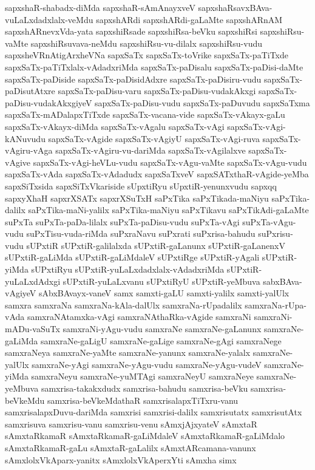 {sapxshaR-shabadx-diMda
sapxshaR-sAmAnayxveV
sapxshaRsavxBAva-vuLaLxdadxlalx-veMdu
sapxshARdi
sapxshARdi-gaLaMte
sapxshARnAM
sapxshARnevxVda-yata
sapxshiRsade
sapxshiRsa-beVku
sapxshiRsi
sapxshiRsu-vaMte
sapxshiRsuvava-neMdu
sapxshiRsu-vu-dilalx
sapxshiRsu-vudu
sapxsheVRnAtigArxheVNa
sapxSaTx
sapxSaTx-toVrike
sapxSaTx-paTiTxde
sapxSaTx-paTiTxlalx-vAdadxriMda
sapxSaTx-paDisalu
sapxSaTx-paDisi-daMte
sapxSaTx-paDiside
sapxSaTx-paDisidAdxre
sapxSaTx-paDisiru-vudu
sapxSaTx-paDisutAtxre
sapxSaTx-paDisu-varu
sapxSaTx-paDisu-vudakAkxgi
sapxSaTx-paDisu-vudakAkxgiyeV
sapxSaTx-paDisu-vudu
sapxSaTx-paDuvudu
sapxSaTxma
sapxSaTx-mADalapxTiTxde
sapxSaTx-vacana-vide
sapxSaTx-vAkayx-gaLu
sapxSaTx-vAkayx-diMda
sapxSaTx-vAgalu
sapxSaTx-vAgi
sapxSaTx-vAgi-kANuvudu
sapxSaTx-vAgide
sapxSaTx-vAgiyU
sapxSaTx-vAgi-ruva
sapxSaTx-vAgiru-vAga
sapxSaTx-vAgiru-vu-dariMda
sapxSaTx-vAgilalxve
sapxSaTx-vAgive
sapxSaTx-vAgi-heVLu-vudu
sapxSaTx-vAgu-vaMte
sapxSaTx-vAgu-vudu
sapxSaTx-vAda
sapxSaTx-vAdadudx
sapxSaTxveV
sapxSATxthaR-vAgide-yeMba
sapxSiTxsida
sapxSiTxVkariside
sUpxtiRyu
sUpxtiR-yenunxvudu
sapxqq
sapxyXhaH
sapxrXSATx
sapxrXSuTxH
saPxTika
saPxTikada-maNiyu
saPxTika-dalilx
saPxTika-maNi-yalilx
saPxTika-maNiyu
saPxTikavu
saPxTikAdi-gaLaMte
suPxTa
suPxTa-paDa-lilalx
suPxTa-paDisu-vudu
suPxTa-vAgi
suPxTa-vAgu-vudu
suPxTisu-vuda-riMda
suPxraNavu
suPxrati
suPxrisa-bahudu
suPxrisu-vudu
sUPxtiR
sUPxtiR-galilalxda
sUPxtiR-gaLanunx
sUPxtiR-gaLanenxV
sUPxtiR-gaLiMda
sUPxtiR-gaLiMdaleV
sUPxtiRge
sUPxtiR-yAgali
sUPxtiR-yiMda
sUPxtiRyu
sUPxtiR-yuLaLxdadxlalx-vAdadxriMda
sUPxtiR-yuLaLxdAdxgi
sUPxtiR-yuLaLxvanu
sUPxtiRyU
sUPxtiR-yeMbuva
sabxBAva-vAgiyeV
sAbxBAvayx-vaneV
samx
samxti-gaLU
samxti-yalilx
samxti-yalUlx
samxra
samxraNa
samxraNa-kAla-dalUlx
samxraNa-rUpadalilx
samxraNa-rUpa-vAda
samxraNAtamxka-vAgi
samxraNAthaRka-vAgide
samxraNi
samxraNi-mADu-vaSuTx
samxraNi-yAgu-vudu
samxraNe
samxraNe-gaLanunx
samxraNe-gaLiMda
samxraNe-gaLigU
samxraNe-gaLige
samxraNe-gAgi
samxraNege
samxraNeya
samxraNe-yaMte
samxraNe-yanunx
samxraNe-yalalx
samxraNe-yalUlx
samxraNe-yAgi
samxraNe-yAgu-vudu
samxraNe-yAgu-vudeV
samxraNe-yiMda
samxraNeyu
samxraNe-yuMTAgi
samxraNeyU
samxraNeye
samxraNe-yeMbuva
samxrisa-takakxdudx
samxrisa-bahudu
samxrisa-beVku
samxrisa-beVkeMdu
samxrisa-beVkeMdathaR
samxrisalapxTiTxru-vanu
samxrisalapxDuvu-dariMda
samxrisi
samxrisi-dalilx
samxrisutatx
samxrisutAtx
samxrisuva
samxrisu-vanu
samxrisu-venu
sAmxjAjxyateV
sAmxtaR
sAmxtaRkamaR
sAmxtaRkamaR-gaLiMdaleV
sAmxtaRkamaR-gaLiMdalo
sAmxtaRkamaR-gaLu
sAmxtaR-gaLalilx
sAmxtARcamana-vanunx
sAmxlolxVkAparx-yanitx
sAmxlolxVkAperxYti
sAmxha
simx
}
